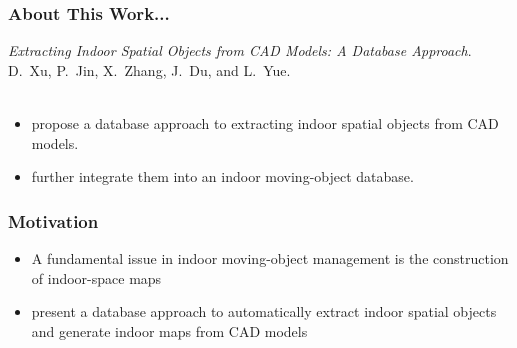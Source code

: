 \begin{frame}
\frametitle{About This Work...}

\emph{Extracting Indoor Spatial Objects from CAD Models: A Database Approach}.~\cite{xu2015extracting} \\
D.~Xu, P.~Jin, X.~Zhang, J.~Du, and L.~Yue.\\~\\

\begin{itemize}
  \item propose a database approach to extracting indoor spatial objects from CAD models.
  \item further integrate them into an indoor moving-object database.
\end{itemize}

\end{frame}


\begin{frame}
\frametitle{Motivation}

\begin{itemize}
  \item A fundamental issue in indoor moving-object management is the construction of indoor-space maps~\cite{turner2014floor}

  \item present a database approach to automatically extract indoor spatial objects and generate indoor maps from CAD models
\end{itemize}

\end{frame}


